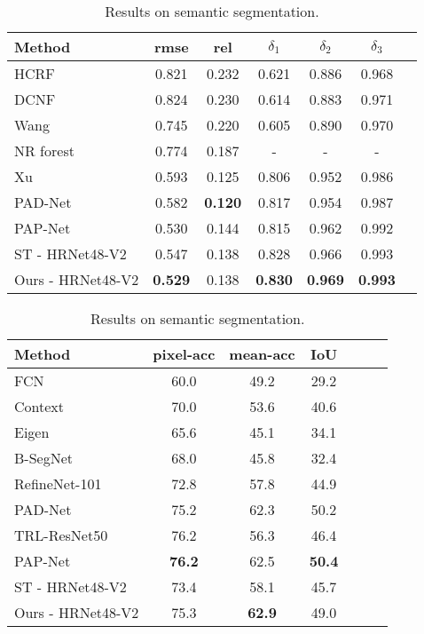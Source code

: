 \documentclass[runningheads]{llncs}
\begin{document}
\begin{table}[t]
    \caption{Comparison with the state-of-the-art on NYUD-v2.}
    \label{tab: nyu_sotat}
\begin{subtable}[t]{0.49\linewidth}
    \centering
    \caption{Results on depth estimation.}
    \label{tab: nyu_depth}
    \tiny{\begin{tabular}{|l|c|c|c|c|c|c|}
\hline
    Method & rmse & rel & $\delta_1$ & $\delta_2$ & $\delta_3$ \\
    \hline
    HCRF \cite{li2015depth} & 0.821 & 0.232 & 0.621 & 0.886 & 0.968 \\
    DCNF \cite{liu2015learning} & 0.824 & 0.230 & 0.614 & 0.883 & 0.971 \\
    Wang \cite{wang2015towards} & 0.745 & 0.220 & 0.605 & 0.890 & 0.970 \\
    NR forest \cite{roy2016monocular} & 0.774 & 0.187 & - & - & - \\
    Xu \cite{xu2018structured} & 0.593 & 0.125 & 0.806 & 0.952 & 0.986 \\
    PAD-Net \cite{xu2018pad} & 0.582 & \textbf{0.120} & 0.817 & 0.954 & 0.987 \\
    PAP-Net \cite{zhang2019pattern} & 0.530 & 0.144 & 0.815 & 0.962 & 0.992 \\
    \hline
    ST - HRNet48-V2 & 0.547 & 0.138 & 0.828 & 0.966 & 0.993 \\
    Ours - HRNet48-V2 & \textbf{0.529} & 0.138 & \textbf{0.830} & \textbf{0.969} & \textbf{0.993} \\
    \hline
    \end{tabular}}
    \end{subtable}\hspace*{\fill}
   \begin{subtable}[t]{0.49\linewidth} \centering
    \caption{Results on semantic segmentation.}
    \label{tab: nyu_sem}
    \tiny{
    \begin{tabular}{|l|c|c|c|c|c|c|}
    \hline
    Method & pixel-acc & mean-acc & IoU \\
    \hline
    FCN \cite{long2015fully} & 60.0 & 49.2 & 29.2 \\
    Context \cite{lin2016efficient} & 70.0 & 53.6 & 40.6 \\
    Eigen \cite{eigen2015predicting} & 65.6 & 45.1 & 34.1 \\
    B-SegNet \cite{kendall2015bayesian} & 68.0 & 45.8 & 32.4 \\
    RefineNet-101 \cite{lin2017refinenet} & 72.8 & 57.8 & 44.9 \\
    PAD-Net \cite{xu2018pad} & 75.2 & 62.3 & 50.2 \\
    TRL-ResNet50 \cite{zhang2018joint} & 76.2 & 56.3 & 46.4 \\
    PAP-Net \cite{zhang2019pattern} & \textbf{76.2} & 62.5 & \textbf{50.4} \\
    \hline
    ST - HRNet48-V2 & 73.4 & 58.1 & 45.7 \\
    Ours - HRNet48-V2 & 75.3 & \textbf{62.9} & 49.0\\
    \hline
    \end{tabular}}
    \end{subtable}

\end{table}
\end{document}
